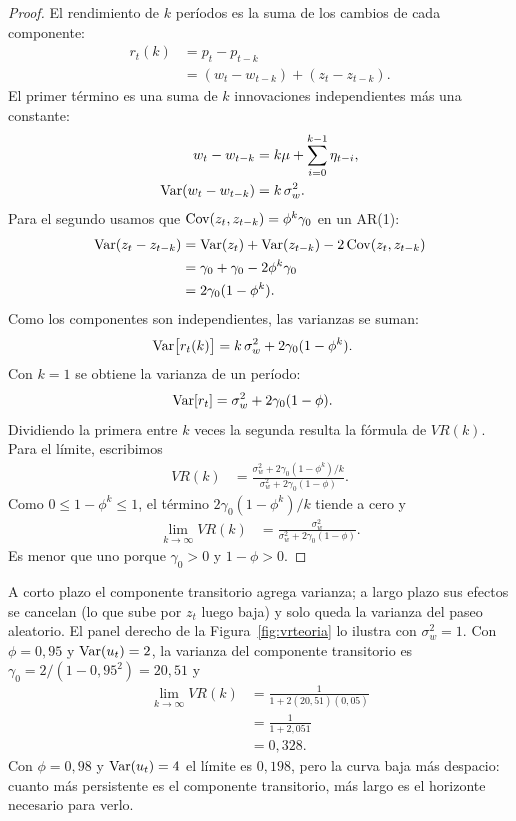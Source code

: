 \begin{proof}
El rendimiento de $k$ períodos es la suma de los cambios de cada componente:
\begin{align*}
  r_t(k) &= p_t-p_{t-k}\\
         &= (w_t-w_{t-k})+(z_t-z_{t-k}).
\end{align*}
El primer término es una suma de $k$ innovaciones independientes más una constante:
\begin{align*}
  w_t-w_{t-k} &= k\mu+\sum_{i=0}^{k-1}\eta_{t-i},\\
  \operatorname{Var}(w_t-w_{t-k}) &= k\,\sigma_w^2 .
\end{align*}
Para el segundo usamos que $\operatorname{Cov}(z_t,z_{t-k})=\phi^k\gamma_0$ en un AR(1):
\begin{align*}
  \operatorname{Var}(z_t-z_{t-k}) &= \operatorname{Var}(z_t)+\operatorname{Var}(z_{t-k})-2\operatorname{Cov}(z_t,z_{t-k})\\
                    &= \gamma_0+\gamma_0-2\phi^k\gamma_0\\
                    &= 2\gamma_0(1-\phi^k).
\end{align*}
Como los componentes son independientes, las varianzas se suman:
\begin{align*}
  \operatorname{Var}\bigl[r_t(k)\bigr] &= k\,\sigma_w^2+2\gamma_0(1-\phi^k).
\end{align*}
Con $k=1$ se obtiene la varianza de un período:
\begin{align*}
  \operatorname{Var}[r_t] &= \sigma_w^2+2\gamma_0(1-\phi).
\end{align*}
Dividiendo la primera entre $k$ veces la segunda resulta la fórmula de $VR(k)$. Para el límite, escribimos
\begin{align*}
  VR(k) &= \frac{\sigma_w^2+2\gamma_0(1-\phi^k)/k}{\sigma_w^2+2\gamma_0(1-\phi)} .
\end{align*}
Como $0\le1-\phi^k\le1$, el término $2\gamma_0(1-\phi^k)/k$ tiende a cero y
\begin{align*}
  \lim_{k\to\infty}VR(k) &= \frac{\sigma_w^2}{\sigma_w^2+2\gamma_0(1-\phi)} .
\end{align*}
Es menor que uno porque $\gamma_0>0$ y $1-\phi>0$.
\end{proof}

A corto plazo el componente transitorio agrega varianza; a largo plazo sus efectos se cancelan (lo que sube por
$z_t$ luego baja) y solo queda la varianza del paseo aleatorio. El panel derecho de la Figura~\ref{fig:vrteoria}
lo ilustra con $\sigma_w^2=1$. Con $\phi=0{,}95$ y $\operatorname{Var}(u_t)=2$, la varianza del componente transitorio es
$\gamma_0=2/(1-0{,}95^2)=20{,}51$ y
\begin{align*}
  \lim_{k\to\infty}VR(k) &= \frac{1}{1+2(20{,}51)(0{,}05)}\\
                         &= \frac{1}{1+2{,}051}\\
                         &= 0{,}328 .
\end{align*}
Con $\phi=0{,}98$ y $\operatorname{Var}(u_t)=4$ el límite es $0{,}198$, pero la curva baja más despacio: cuanto más
persistente es el componente transitorio, más largo es el horizonte necesario para verlo.


